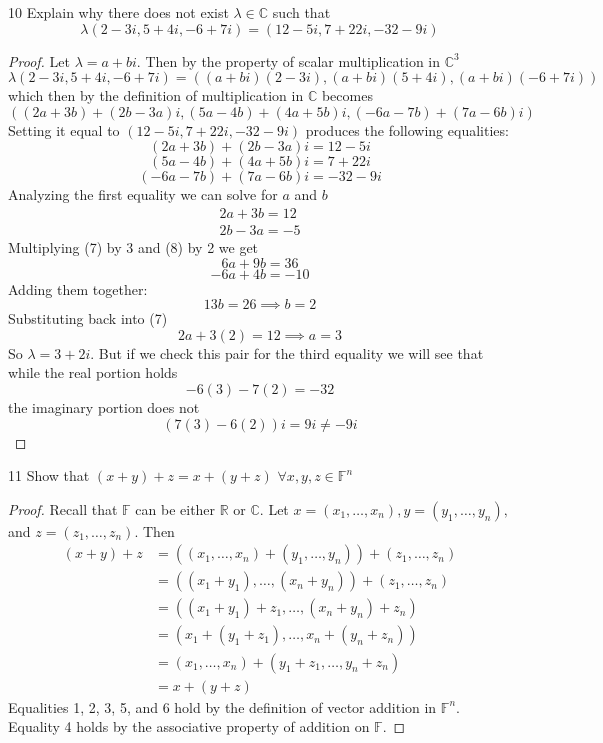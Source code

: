 \documentclass[12pt]{article}
\newenvironment{problem}[1]{\begin{prob*}{#1}{}}{\end{prob*}}
\begin{document}
\begin{problem}{10}
Explain why there does not exist $\lambda \in \mathbb{C}$ such that \[\lambda(2-3i,5+4i,-6+7i)=(12-5i,7+22i,-32-9i)\]
\end{problem}
\begin{proof}
    Let $\lambda =a+bi$. Then by the property of scalar multiplication in $\mathbb{C}^3$
    \[\lambda(2-3i,5+4i,-6+7i)=((a+bi)(2-3i),(a+bi)(5+4i),(a+bi)(-6+7i))\]
    which then by the definition of multiplication in $\mathbb{C}$ becomes
    \[((2a+3b)+(2b-3a)i,(5a-4b)+(4a+5b)i,(-6a-7b)+(7a-6b)i)\]
    Setting it equal to $(12-5i,7+22i,-32-9i)$ produces the following equalities:
    \[(2a+3b)+(2b-3a)i=12-5i\]
    \[(5a-4b)+(4a+5b)i=7+22i\]
    \[(-6a-7b)+(7a-6b)i=-32-9i\]
    Analyzing the first equality we can solve for $a$ and $b$
    \begin{align}
        2a+3b=12\\
        2b-3a=-5
    \end{align}
    Multiplying (7) by 3 and (8) by 2 we get
    \[6a+9b=36\]
    \[-6a+4b=-10\]
    Adding them together:
    \[13b=26\implies b=2\]
    Substituting back into (7)
    \[2a+3(2)=12\implies a=3\]
    So $\lambda =3+2i$. But if we check this pair for the third equality we will see that while the real portion holds
    \[-6(3)-7(2)=-32\]
    the imaginary portion does not
    \[(7(3)-6(2))i=9i\ne -9i\]
\end{proof}

\begin{problem}{11}
Show that $(x+y)+z=x+(y+z)$ $\forall x,y,z\in \mathbb{F}^n$
\end{problem}
\begin{proof}
    Recall that $\mathbb{F}$ can be either $\mathbb{R}$ or $\mathbb{C}$. 
    Let $x=(x_1,\ldots,x_n),y=(y_1,\ldots,y_n),$ and $z=(z_1,\ldots, z_n)$. Then
    \begin{align*}
        (x+y)+z&=((x_1,\ldots,x_n)+(y_1,\ldots,y_n))+(z_1,\ldots,z_n)\\
        &=((x_1+y_1),\ldots,(x_n+y_n))+(z_1,\ldots,z_n)\\
        &=((x_1+y_1)+z_1,\ldots, (x_n+y_n)+z_n)\\
        &=(x_1+(y_1+z_1),\ldots,x_n+(y_n+z_n))\\
        &=(x_1,\ldots,x_n)+(y_1+z_1,\ldots,y_n+z_n)\\
        &=x+(y+z)
    \end{align*}
    Equalities 1, 2, 3, 5, and 6 hold by the definition of vector addition in $\mathbb{F}^n$. Equality 4 holds by the associative property of addition on $\mathbb{F}$.
\end{proof}
\end{document}
